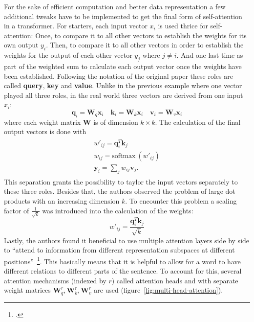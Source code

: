 For the sake of efficient computation and better data representation a few additional tweaks have to be implemented to get the final form of self-attention in a transformer. For starters, each input vector $ x_i $ is used thrice for self-attention: Once, to compare it to all other vectors to establish the weights for its own output $ y_i $. Then, to compare it to all other vectors in order to establish the weights for the output of each other vector $ y_j $ where $ j \neq i $. And one last time as part of the weighted sum to calculate each output vector once the weights have been established. Following the notation of the original paper these roles are called \textbf{query}, \textbf{key} and \textbf{value}. Unlike in the previous example where one vector played all three roles, in the real world three vectors are derived from one input $ x_i $:
\begin{equation}
	\boldsymbol{q}_i = \boldsymbol{W}_q \boldsymbol{x}_i \quad \boldsymbol{k}_i = \boldsymbol{W}_k \boldsymbol{x}_i \quad \boldsymbol{v}_i = \boldsymbol{W}_v \boldsymbol{x}_i
\end{equation}
where each weight matrix $ \boldsymbol{W} $ is of dimension $ k \times k $. The calculation of the final output vectors is done with
\begin{align}
	\begin{split}
		w'_{ij} = \boldsymbol{q}_i^T \boldsymbol{k}_j \\
		w_{ij} = \text{softmax} \ (w'_{ij}) \\
		\boldsymbol{y}_i = \sum_j w_{ij} \boldsymbol{v}_j.
	\end{split}
\end{align}
This separation grants the possibility to taylor the input vectors separately to these three roles. Besides that, the authors observed the problem of large dot products with an increasing dimension $ k $. To encounter this problem a scaling factor of $ \frac{1}{\sqrt{k}} $ was introduced into the calculation of the weights:
\begin{equation}
	w'_{ij} = \frac{\boldsymbol{q}_i^T \boldsymbol{k}_j}{\sqrt{k}}
\end{equation}
Lastly, the authors found it beneficial to use multiple attention layers side by side to ``attend to information from different representation subspaces at different positions''~\footcite{DBLP:journals/corr/VaswaniSPUJGKP17}. This basically means that it is helpful to allow for a word to have different relations to different parts of the sentence. To account for this, several attention mechanisms (indexed by $ r $) called attention heads and with separate weight matrices $ \boldsymbol{W}_q^r, \boldsymbol{W}_k^r, \boldsymbol{W}_v^r $ are used (figure~\ref{fig:multi-head-attention}).

